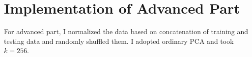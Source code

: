 \documentclass[a4paper]{article}
\begin{document}
\section{Implementation of Advanced Part}

For advanced part, I normalized the data based on concatenation of training and testing data and randomly shuffled them. I adopted ordinary PCA and took $k=256$.

%
\end{document}
